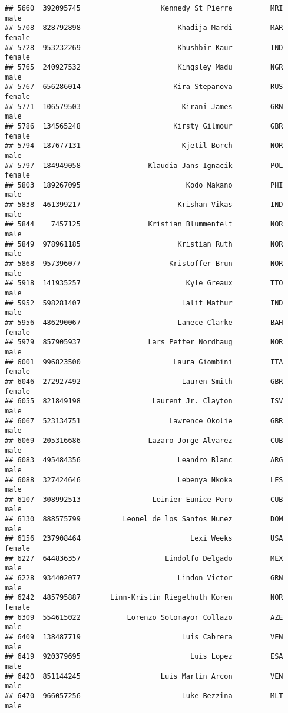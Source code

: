 \documentclass[]{article}
\begin{document}
\begin{verbatim}
## 5660  392095745                   Kennedy St Pierre         MRI   male
## 5708  828792898                       Khadija Mardi         MAR female
## 5728  953232269                       Khushbir Kaur         IND female
## 5765  240927532                       Kingsley Madu         NGR   male
## 5767  656286014                      Kira Stepanova         RUS female
## 5771  106579503                        Kirani James         GRN   male
## 5786  134565248                      Kirsty Gilmour         GBR female
## 5794  187677131                        Kjetil Borch         NOR   male
## 5797  184949058                Klaudia Jans-Ignacik         POL female
## 5803  189267095                         Kodo Nakano         PHI   male
## 5838  461399217                       Krishan Vikas         IND   male
## 5844    7457125                Kristian Blummenfelt         NOR   male
## 5849  978961185                       Kristian Ruth         NOR   male
## 5868  957396077                     Kristoffer Brun         NOR   male
## 5918  141935257                         Kyle Greaux         TTO   male
## 5952  598281407                        Lalit Mathur         IND   male
## 5956  486290067                       Lanece Clarke         BAH female
## 5979  857905937                Lars Petter Nordhaug         NOR   male
## 6001  996823500                      Laura Giombini         ITA female
## 6046  272927492                        Lauren Smith         GBR female
## 6055  821849198                 Laurent Jr. Clayton         ISV   male
## 6067  523134751                     Lawrence Okolie         GBR   male
## 6069  205316686                Lazaro Jorge Alvarez         CUB   male
## 6083  495484356                       Leandro Blanc         ARG   male
## 6088  327424646                       Lebenya Nkoka         LES   male
## 6107  308992513                 Leinier Eunice Pero         CUB   male
## 6130  888575799          Leonel de los Santos Nunez         DOM   male
## 6156  237908464                          Lexi Weeks         USA female
## 6227  644836357                    Lindolfo Delgado         MEX   male
## 6228  934402077                       Lindon Victor         GRN   male
## 6242  485795887       Linn-Kristin Riegelhuth Koren         NOR female
## 6309  554615022           Lorenzo Sotomayor Collazo         AZE   male
## 6409  138487719                        Luis Cabrera         VEN   male
## 6419  920379695                          Luis Lopez         ESA   male
## 6420  851144245                   Luis Martin Arcon         VEN   male
## 6470  966057256                        Luke Bezzina         MLT   male

\end{verbatim}
\end{document}
